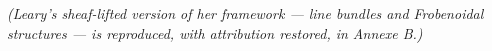 \textit{(Leary's sheaf-lifted version of her framework --- line bundles and Frobenoidal structures --- is reproduced, with attribution restored, in Annexe B.)}

% 
% 
% 
% 
% 
